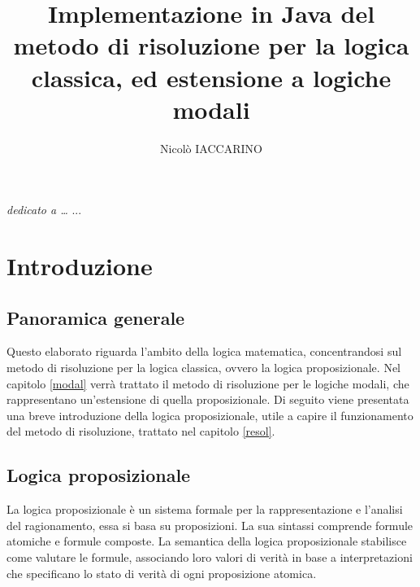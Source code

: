 \documentclass[a4paper,12pt]{report}
\begin{document}
\title{Implementazione in Java del metodo di risoluzione per la logica classica, ed estensione a logiche modali}
\author{Nicolò IACCARINO}
% 
%
\beforepreface
{}
        {\hfill \Large {\sl dedicato a \dots}}
% 
%
...

%
%

\afterpreface
\pagestyle{mystyle} %
% 
% 
\chapter{Introduzione}
\label{intro}

\section{Panoramica generale}
Questo elaborato riguarda l'ambito della logica matematica, concentrandosi sul metodo di risoluzione per la logica classica, ovvero la logica proposizionale. Nel capitolo \ref{modal} verrà trattato il metodo di risoluzione per le logiche modali, che rappresentano un'estensione di quella proposizionale. Di seguito viene presentata una breve introduzione della logica proposizionale, utile a capire il funzionamento del metodo di risoluzione, trattato nel capitolo \ref{resol}.

\section{Logica proposizionale}

La logica proposizionale è un sistema formale per la rappresentazione e l'analisi del ragionamento, essa si basa su proposizioni. La sua sintassi comprende formule atomiche e formule composte. La semantica della logica proposizionale stabilisce come valutare le formule, associando loro valori di verità in base a interpretazioni che specificano lo stato di verità di ogni proposizione atomica.
\end{document}
